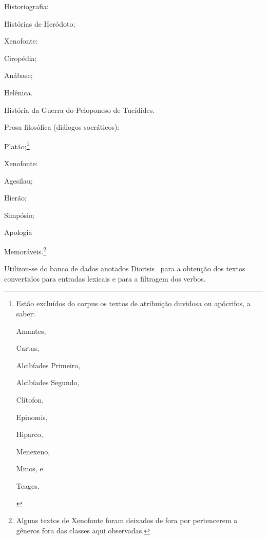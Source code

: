\documentclass[a4paper,article,12pt,oneside]{memoir}
\begin{document}
\begin{compactitem}
	\item Historiografia:
	\begin{compactenum}
		\item Histórias de Heródoto;
		\item Xenofonte:
		\begin{inparaenum}[(a)]
			\item Ciropédia;
			\item Anábase;
			\item Helênica.
		\end{inparaenum}
		\item História da Guerra do Peloponeso de Tucídides.
	\end{compactenum}
	\item Prosa filosófica (diálogos socráticos):
	\begin{compactenum}
		\item Platão;\footnote{%
			Estão excluídos do corpus os textos de atribuição duvidosa ou apócrifos, a saber:
			\begin{inparaenum}[(a)]
				\item Amantes,
				\item Cartas,
				\item Alcibíades Primeiro,
				\item Alcibíades Segundo,
				\item Clítofon,
				\item Epinomis,
				\item Hiparco,
				\item Menexeno,
				\item Minos, e
				\item Teages.
			\end{inparaenum}
		}
		\item Xenofonte:
		\begin{inparaenum}[(a)]
			\item Agesilau;
			\item Hierão;
			\item Simpósio;
			\item Apologia
			\item Memoráveis.\footnote{Alguns textos de Xenofonte foram deixados de fora por pertencerem a gêneros fora das classes aqui observadas.}
		\end{inparaenum}
	\end{compactenum}
\end{compactitem}

\noindent Utilizou-se do banco de dados anotados Diorisis~\cite{diorisis2021} para a obtenção dos textos convertidos para entradas lexicais e para a filtragem dos verbos.
\end{document}
